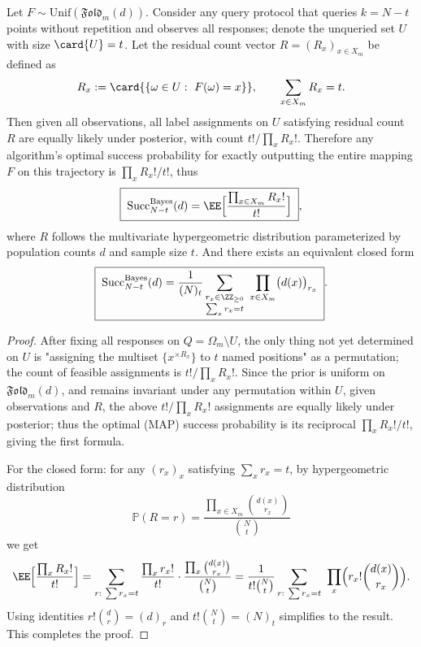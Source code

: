 



\begin{theorem}\label{thm:pom-microcanonical-fold-bayes-success-Nminus-t}
Let \(F\sim\mathrm{Unif}(\mathfrak{Fold}_m(d))\).
Consider any query protocol that queries \(k=N-t\) points without repetition and observes all responses; denote the unqueried set \(U\) with size \(\card{U}=t\).
Let the residual count vector \(R=(R_x)_{x\in X_m}\) be defined as
\[
R_x:=\card{\{\omega\in U:\ F(\omega)=x\}},\qquad \sum_{x\in X_m}R_x=t.
\]
Then given all observations, all label assignments on \(U\) satisfying residual count \(R\) are equally likely under posterior, with count \(t!/\prod_x R_x!\).
Therefore any algorithm's optimal success probability for exactly outputting the entire mapping \(F\) on this trajectory is \(\prod_x R_x!/t!\), thus
\[
\boxed{\;
\mathrm{Succ}^{\mathrm{Bayes}}_{N-t}(d)
=\EE\Bigl[\frac{\prod_{x\in X_m}R_x!}{t!}\Bigr]\;},
\]
where \(R\) follows the multivariate hypergeometric distribution parameterized by population counts \(d\) and sample size \(t\).
And there exists an equivalent closed form
\[
\boxed{\;
\mathrm{Succ}^{\mathrm{Bayes}}_{N-t}(d)
=\frac{1}{(N)_t}\sum_{\substack{r_x\in\ZZ_{\ge 0}\\ \sum_x r_x=t}}\ \prod_{x\in X_m}\bigl(d(x)\bigr)_{r_x}\; } .
\]
\end{theorem}
\begin{proof}
After fixing all responses on \(Q=\Omega_m\setminus U\), the only thing not yet determined on \(U\) is "assigning the multiset \(\{x^{\times R_x}\}\) to \(t\) named positions" as a permutation;
the count of feasible assignments is \(t!/\prod_x R_x!\).
Since the prior is uniform on \(\mathfrak{Fold}_m(d)\), and remains invariant under any permutation within \(U\), given observations and \(R\), the above \(t!/\prod_x R_x!\) assignments are equally likely under posterior;
thus the optimal (MAP) success probability is its reciprocal \(\prod_x R_x!/t!\), giving the first formula.
\par
For the closed form: for any \((r_x)_x\) satisfying \(\sum_x r_x=t\), by hypergeometric distribution
\[
\mathbb{P}(R=r)=\frac{\prod_{x\in X_m}\binom{d(x)}{r_x}}{\binom{N}{t}}
\]
we get
\[
\EE\Bigl[\frac{\prod_x R_x!}{t!}\Bigr]
=\sum_{r:\ \sum r_x=t}\frac{\prod_x r_x!}{t!}\cdot \frac{\prod_x\binom{d(x)}{r_x}}{\binom{N}{t}}
=\frac{1}{t!\binom{N}{t}}\sum_{r:\ \sum r_x=t}\ \prod_x\Bigl(r_x!\binom{d(x)}{r_x}\Bigr).
\]
Using identities \(r!\binom{d}{r}=(d)_r\) and \(t!\binom{N}{t}=(N)_t\) simplifies to the result. This completes the proof.
\end{proof}

